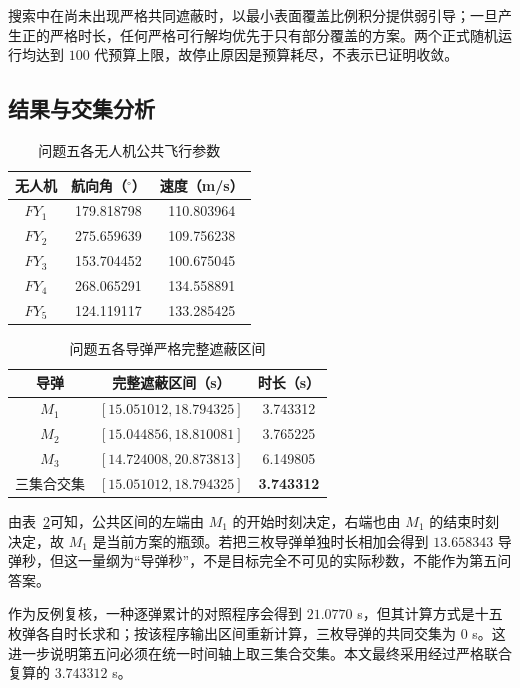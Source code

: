 \documentclass[12pt,a4paper]{article}
\begin{document}
搜索中在尚未出现严格共同遮蔽时，以最小表面覆盖比例积分提供弱引导；一旦产生正的严格时长，任何严格可行解均优先于只有部分覆盖的方案。两个正式随机运行均达到 $100$ 代预算上限，故停止原因是预算耗尽，不表示已证明收敛。

\subsection{结果与交集分析}

\begin{table}[H]
\centering
\caption{问题五各无人机公共飞行参数}
\label{tab:q5-uav}
\begin{tabular}{ccc}
\toprule
无人机 & 航向角（$^\circ$） & 速度（m/s） \\
\midrule
$FY_1$ & 179.818798 & 110.803964 \\
$FY_2$ & 275.659639 & 109.756238 \\
$FY_3$ & 153.704452 & 100.675045 \\
$FY_4$ & 268.065291 & 134.558891 \\
$FY_5$ & 124.119117 & 133.285425 \\
\bottomrule
\end{tabular}
\end{table}

\begin{table}[H]
\centering
\caption{问题五各导弹严格完整遮蔽区间}
\label{tab:q5-missile}
\begin{tabular}{ccc}
\toprule
导弹 & 完整遮蔽区间（s） & 时长（s） \\
\midrule
$M_1$ & $[15.051012,18.794325]$ & 3.743312 \\
$M_2$ & $[15.044856,18.810081]$ & 3.765225 \\
$M_3$ & $[14.724008,20.873813]$ & 6.149805 \\
\midrule
三集合交集 & $[15.051012,18.794325]$ & \textbf{3.743312} \\
\bottomrule
\end{tabular}
\end{table}

由表~\ref{tab:q5-missile}可知，公共区间的左端由 $M_1$ 的开始时刻决定，右端也由 $M_1$ 的结束时刻决定，故 $M_1$ 是当前方案的瓶颈。若把三枚导弹单独时长相加会得到 $13.658343$ 导弹秒，但这一量纲为“导弹秒”，不是目标完全不可见的实际秒数，不能作为第五问答案。

作为反例复核，一种逐弹累计的对照程序会得到 $21.0770$ s，但其计算方式是十五枚弹各自时长求和；按该程序输出区间重新计算，三枚导弹的共同交集为 $0$ s。这进一步说明第五问必须在统一时间轴上取三集合交集。本文最终采用经过严格联合复算的 $3.743312$ s。
\end{document}
